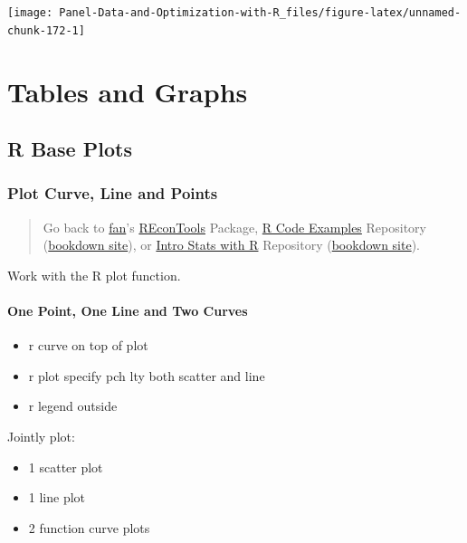 \documentclass[
]{book}
\providecommand{\tightlist}{%
  \setlength{\itemsep}{0pt}\setlength{\parskip}{0pt}}
\begin{document}
\begin{center}\texttt{[image: Panel-Data-and-Optimization-with-R\_files/figure-latex/unnamed-chunk-172-1]} \end{center}

\hypertarget{tables-and-graphs}{%
\chapter{Tables and Graphs}\label{tables-and-graphs}}

\hypertarget{r-base-plots}{%
\section{R Base Plots}\label{r-base-plots}}

\hypertarget{plot-curve-line-and-points}{%
\subsection{Plot Curve, Line and Points}\label{plot-curve-line-and-points}}

\begin{quote}
Go back to \href{http://fanwangecon.github.io/}{fan}'s \href{https://fanwangecon.github.io/REconTools/}{REconTools} Package, \href{https://fanwangecon.github.io/R4Econ/}{R Code Examples} Repository (\href{https://fanwangecon.github.io/R4Econ/bookdown}{bookdown site}), or \href{https://fanwangecon.github.io/Stat4Econ/}{Intro Stats with R} Repository (\href{https://fanwangecon.github.io/Stat4Econ/bookdown}{bookdown site}).
\end{quote}

Work with the R plot function.

\hypertarget{one-point-one-line-and-two-curves}{%
\subsubsection{One Point, One Line and Two Curves}\label{one-point-one-line-and-two-curves}}

\begin{itemize}
\tightlist
\item
  r curve on top of plot
\item
  r plot specify pch lty both scatter and line
\item
  r legend outside
\end{itemize}

Jointly plot:

\begin{itemize}
\tightlist
\item
  1 scatter plot
\item
  1 line plot
\item
  2 function curve plots
\end{itemize}
\end{document}
